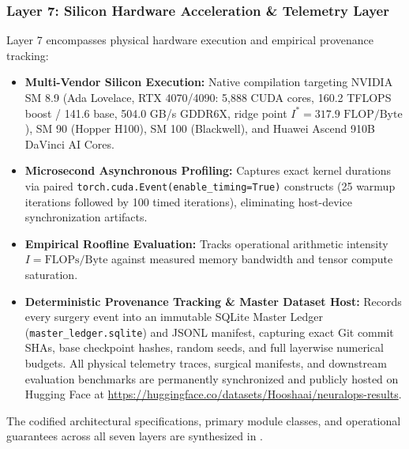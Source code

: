 \subsubsection{Layer 7: Silicon Hardware Acceleration \& Telemetry Layer}
Layer 7 encompasses physical hardware execution and empirical provenance tracking:
\begin{itemize}
    \item \textbf{Multi-Vendor Silicon Execution:} Native compilation targeting NVIDIA SM 8.9 (Ada Lovelace, RTX 4070/4090: 5,888 CUDA cores, 160.2 TFLOPS boost / 141.6 base, 504.0 GB/s GDDR6X, ridge point $I^* = 317.9\text{ FLOP/Byte}$), SM 90 (Hopper H100), SM 100 (Blackwell), and Huawei Ascend 910B DaVinci AI Cores.
    \item \textbf{Microsecond Asynchronous Profiling:} Captures exact kernel durations via paired \texttt{torch.cuda.Event(enable\_timing=True)} constructs (25 warmup iterations followed by 100 timed iterations), eliminating host-device synchronization artifacts.
    \item \textbf{Empirical Roofline Evaluation:} Tracks operational arithmetic intensity $I = \text{FLOPs} / \text{Byte}$ against measured memory bandwidth and tensor compute saturation.
    \item \textbf{Deterministic Provenance Tracking \& Master Dataset Host:} Records every surgery event into an immutable SQLite Master Ledger (\texttt{master\_ledger.sqlite}) and JSONL manifest, capturing exact Git commit SHAs, base checkpoint hashes, random seeds, and full layerwise numerical budgets. All physical telemetry traces, surgical manifests, and downstream evaluation benchmarks are permanently synchronized and publicly hosted on Hugging Face at \url{https://huggingface.co/datasets/Hooshaai/neuralops-results}.
\end{itemize}

The codified architectural specifications, primary module classes, and operational guarantees across all seven layers are synthesized in .


